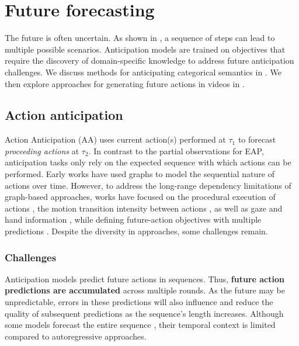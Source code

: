 \section{Future forecasting}
\label{sec:forecasting}

The future is often uncertain. As shown in , a sequence of steps can lead to multiple possible scenarios. Anticipation models are trained on objectives that require the discovery of domain-specific knowledge to address future anticipation challenges. We discuss methods for anticipating categorical semantics in . We then explore approaches for generating future actions in videos in .



\subsection{Action anticipation}
\label{sec:forecasting::anticipation}

Action Anticipation (AA) uses current action(s) performed at $\tau_1$ to forecast \emph{proceeding actions} at $\tau_2$. In contrast to the partial observations for EAP, anticipation tasks only rely on the expected sequence with which actions can be performed. Early works  have used graphs to model the sequential nature of actions over time. However, to address the long-range dependency limitations of graph-based approaches, works have focused on the procedural execution of actions , the motion transition intensity between actions , as well as gaze and hand information , while defining future-action objectives with multiple predictions . Despite the diversity in approaches, some challenges remain.

\subsubsection{Challenges}
\label{sec:forecasting::anticipation:::challenges}


Anticipation models predict future actions in sequences. Thus, \textbf{future action predictions are accumulated} across multiple rounds. As the future may be unpredictable, errors in these predictions will also influence and reduce the quality of subsequent predictions as the sequence's length increases. Although some models forecast the entire sequence , their temporal context is limited compared to autoregressive approaches.  

